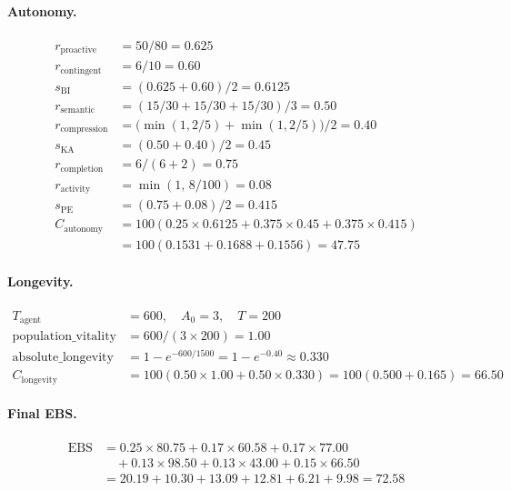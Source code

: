 \documentclass[a4paper, 11pt]{article}
\newcommand{\ebs}{\text{EBS}}
\begin{document}
\paragraph{Autonomy.}
\begin{align*}
    r_{\text{proactive}} &= 50/80 = 0.625 \\
    r_{\text{contingent}} &= 6/10 = 0.60 \\
    s_{\text{BI}} &= (0.625 + 0.60)/2 = 0.6125 \\[4pt]
    r_{\text{semantic}} &= (15/30 + 15/30 + 15/30)/3 = 0.50 \\
    r_{\text{compression}} &= \bigl(\min(1,2/5) + \min(1,2/5)\bigr)/2 = 0.40 \\
    s_{\text{KA}} &= (0.50 + 0.40)/2 = 0.45 \\[4pt]
    r_{\text{completion}} &= 6/(6+2) = 0.75 \\
    r_{\text{activity}} &= \min(1,\, 8/100) = 0.08 \\
    s_{\text{PE}} &= (0.75 + 0.08)/2 = 0.415 \\[4pt]
    C_{\text{autonomy}} &= 100(0.25 \times 0.6125 + 0.375 \times 0.45 + 0.375 \times 0.415) \\
                        &= 100(0.1531 + 0.1688 + 0.1556) = \mathbf{47.75}
\end{align*}

\paragraph{Longevity.}
\begin{align*}
    T_{\text{agent}} &= 600, \quad A_0 = 3, \quad T = 200 \\
    \text{population\_vitality} &= 600 / (3 \times 200) = 1.00 \\
    \text{absolute\_longevity} &= 1 - e^{-600/1500} = 1 - e^{-0.40} \approx 0.330 \\
    C_{\text{longevity}} &= 100(0.50 \times 1.00 + 0.50 \times 0.330) = 100(0.500 + 0.165) = \mathbf{66.50}
\end{align*}

\paragraph{Final EBS.}
\begin{align*}
    \ebs &= 0.25 \times 80.75 + 0.17 \times 60.58 + 0.17 \times 77.00 \\
    &\quad + 0.13 \times 98.50 + 0.13 \times 43.00 + 0.15 \times 66.50 \\
    &= 20.19 + 10.30 + 13.09 + 12.81 + 6.21 + 9.98 = \boxed{72.58}
\end{align*}
\end{document}
